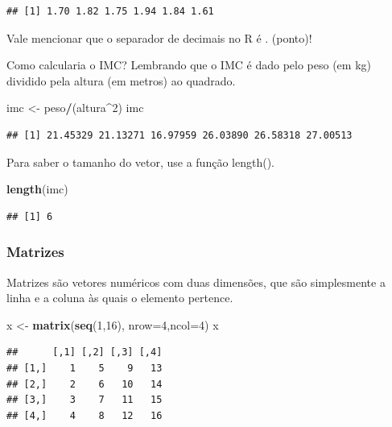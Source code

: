 \documentclass[
]{book}
\newenvironment{Shaded}{\begin{snugshade}}{\end{snugshade}}
\newcommand{\DataTypeTok}[1]{\textcolor[rgb]{0.13,0.29,0.53}{#1}}
\newcommand{\DecValTok}[1]{\textcolor[rgb]{0.00,0.00,0.81}{#1}}
\newcommand{\KeywordTok}[1]{\textcolor[rgb]{0.13,0.29,0.53}{\textbf{#1}}}
\newcommand{\NormalTok}[1]{#1}
\newcommand{\OperatorTok}[1]{\textcolor[rgb]{0.81,0.36,0.00}{\textbf{#1}}}
\newcommand{\StringTok}[1]{\textcolor[rgb]{0.31,0.60,0.02}{#1}}
\begin{document}
\begin{verbatim}
## [1] 1.70 1.82 1.75 1.94 1.84 1.61
\end{verbatim}

Vale mencionar que o separador de decimais no R é . (ponto)!

Como calcularia o IMC? Lembrando que o IMC é dado pelo peso (em kg) dividido pela altura (em metros) ao quadrado.

\begin{Shaded}
\begin{Highlighting}[]
\NormalTok{imc <-}\StringTok{ }\NormalTok{peso}\OperatorTok{/}\NormalTok{(altura}\OperatorTok{^}\DecValTok{2}\NormalTok{)}
\NormalTok{imc}
\end{Highlighting}
\end{Shaded}

\begin{verbatim}
## [1] 21.45329 21.13271 16.97959 26.03890 26.58318 27.00513
\end{verbatim}

Para saber o tamanho do vetor, use a função length().

\begin{Shaded}
\begin{Highlighting}[]
\KeywordTok{length}\NormalTok{(imc)}
\end{Highlighting}
\end{Shaded}

\begin{verbatim}
## [1] 6
\end{verbatim}

\hypertarget{matrizes}{%
\subsubsection{Matrizes}\label{matrizes}}

Matrizes são vetores numéricos com duas dimensões, que são simplesmente a linha e a coluna às quais o elemento pertence.

\begin{Shaded}
\begin{Highlighting}[]
\NormalTok{x <-}\StringTok{ }\KeywordTok{matrix}\NormalTok{(}\KeywordTok{seq}\NormalTok{(}\DecValTok{1}\NormalTok{,}\DecValTok{16}\NormalTok{), }\DataTypeTok{nrow=}\DecValTok{4}\NormalTok{,}\DataTypeTok{ncol=}\DecValTok{4}\NormalTok{)}
\NormalTok{x}
\end{Highlighting}
\end{Shaded}

\begin{verbatim}
##      [,1] [,2] [,3] [,4]
## [1,]    1    5    9   13
## [2,]    2    6   10   14
## [3,]    3    7   11   15
## [4,]    4    8   12   16
\end{verbatim}
\end{document}
